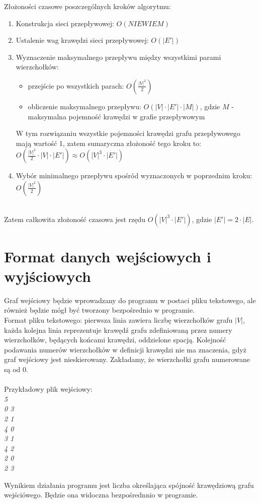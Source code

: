 \documentclass{article}
\begin{document}
Złożoności czasowe poszczególnych kroków algorytmu: 
\begin{enumerate}
\item Konstrukcja sieci przepływowej: $O(NIE WIEM)$
\item Ustalenie wag krawędzi sieci przepływowej: $O(|E'|)$
\item Wyznaczenie maksymalnego przepływu między wszystkimi parami wierzchołków: 
\begin{itemize}
    \item przejście po wszystkich parach: $O(\frac{|V|^{2}}{2})$
    \item obliczenie maksymalnego przepływu: $O(|V|\cdot |E'|\cdot |M|)$, gdzie $M$ - maksymalna pojemność krawędzi w grafie przepływowym
\end{itemize}
W tym rozwiązaniu wszystkie pojemności krawędzi grafu przepływowego mają wartość 1, zatem sumaryczna złożoność tego kroku to: $O(\frac{|V|^{2}}{2}\cdot|V|\cdot |E'|) \approx O(|V|^{3}\cdot |E'|)$
\item Wybór minimalnego przepływu spośród wyznaczonych w poprzednim kroku: $O(\frac{|V|^{2}}{2})$
\end{enumerate}\\
Zatem całkowita złożoność czasowa jest rzędu $O(|V|^{3}\cdot |E'|)$, gdzie $|E'|=2\cdot |E|$.\\


\section{Format danych wejściowych i wyjściowych}
Graf wejściowy będzie wprowadzany do programu w postaci pliku tekstowego, ale również będzie mógł być tworzony bezpośrednio w programie.\\

Format pliku tekstowego: pierwsza linia zawiera liczbę wierzchołków grafu $|V|$, każda kolejna linia reprezentuje krawędź grafu zdefiniowaną przez numery wierzchołków, będących końcami krawędzi, oddzielone spacją. Kolejność podawania numerów wierzchołków w definicji krawędzi nie ma znaczenia, gdyż graf wejściowy jest nieskierowany. Zakładamy, że wierzchołki grafu numerowane są od 0.
\\\\
Przykładowy plik wejściowy:\\
\textit{5\\
0 3\\
2 1\\
4 0\\
3 1\\
4 2\\
2 0\\
2 3\\
}


Wynikiem działania programu jest liczba określająca spójność krawędziową grafu wejściówego. Będzie ona widoczna bezpośrednnio w programie.
\end{document}
